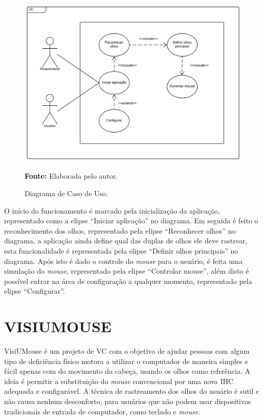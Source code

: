 \begin{figure}[H]
\caption{Diagrama de Caso de Uso.}
\centering \includegraphics[scale=.5]{img/UseCase_Diagram_2.png}

{\fontsize{11}{11}\selectfont \textbf{Fonte:} Elaborada pelo autor.}
\label{fig:use-case-diagram}
\end{figure}

O início do funcionamento é marcado pela inicialização da aplicação, representado como a elipse “Iniciar aplicação” no diagrama. Em seguida é feito o reconhecimento dos olhos, representado pela elipse “Reconhecer olhos” no diagrama, a aplicação ainda define qual das duplas de olhos ele deve rastrear, esta funcionalidade é representada pela elipse “Definir olhos principais” no diagrama.  Após isto é dado o controle do \textit{mouse} para o usuário, é feita uma simulação do \textit{mouse}, representado pela elipse “Controlar mouse”, além disto é possível entrar na área de configuração a qualquer momento, representado pela elipse “Configurar”.




\chapter{VISIUMOUSE}\label{CAP4}
VisiUMouse é um projeto de VC com o objetivo de ajudar pessoas com algum tipo de deficiência físico motora a utilizar o computador de maneira simples e fácil apenas com do movimento da cabeça, usando os olhos como referência. A ideia é permitir a substituição do \textit{mouse} convencional por uma nova IHC adequada e configurável. A técnica de  rastreamento dos olhos do usuário é sutil e não causa nenhum desconforto, para usuários que não podem usar dispositivos tradicionais de entrada de computador, como teclado e \textit{mouse}.

